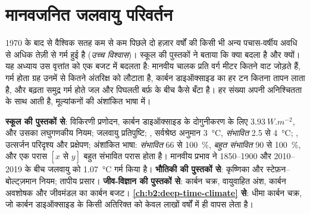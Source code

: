 \chapter{मानवजनित जलवायु परिवर्तन}\label{ch:b2:anthropogenic-climate-change}

1970 के बाद से वैश्विक सतह कम से कम पिछले दो हज़ार वर्षों की किसी भी अन्य पचास-वर्षीय अवधि से अधिक
तेज़ी से गर्म हुई है (\emph{उच्च विश्वास})। स्कूल की पुस्तकों ने बताया कि क्या बदला है और
क्यों। यह अध्याय उस वृत्तांत को एक बजट में बदलता है: मानवीय चालक प्रति वर्ग मीटर कितने वाट जोड़ते हैं,
गर्म होता ग्रह उनमें से कितने अंतरिक्ष को लौटाता है, कार्बन डाइऑक्साइड का हर टन कितना तापन लाता है,
और बढ़ता समुद्र गर्म होते जल और पिघलती बर्फ़ के बीच कैसे बँटा है। हर संख्या अपनी अनिश्चितता के साथ
आती है, मूल्यांकनों की अंशांकित भाषा में।

\begin{recall}
\textbf{स्कूल की पुस्तकों से}: विकिरणी प्रणोदन, कार्बन डाइऑक्साइड के दोगुनीकरण के लिए $\qty{3.93}{W.m^{-2}}$,
और उसका लघुगणकीय नियम; जलवायु प्रतिपुष्टि; , सर्वश्रेष्ठ
अनुमान \qty{3}{\celsius}, \emph{संभावित} 2.5 से \qty{4}{\celsius}; , उत्सर्जन परिदृश्य
और प्रक्षेपण; अंशांकित भाषा: \emph{संभावित} 66 से \qty{100}{\percent}, \emph{बहुत
संभावित} 90 से \qty{100}{\percent}, और एक परास $[x \text{ से } y]$ बहुत संभावित परास होता है। मानवीय
प्रभाव ने 1850--1900 और 2010--2019 के बीच जलवायु को \qty{1.07}{\celsius} गर्म किया है।
\textbf{भौतिकी की पुस्तकों से}: कृष्णिका और स्टेफ़न--बोल्ट्ज़मान नियम; तापीय प्रसार।
\textbf{जीव-विज्ञान की पुस्तकों से}: कार्बन चक्र, वायुवाहित अंश, कार्बन अवशोषक और जीवमंडल का
कार्बन बजट। \textbf{\cref{ch:b2:deep-time-climate} से}: धीमा कार्बन चक्र, जो
कार्बन डाइऑक्साइड के किसी अतिरिक्त को केवल लाखों वर्षों में ही वापस लेता है।
\end{recall}

